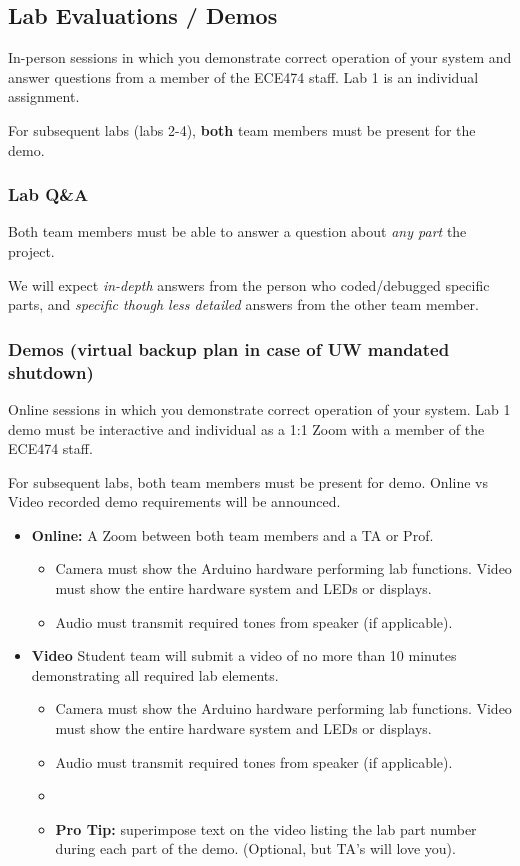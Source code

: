 \documentclass{article}	%
\begin{document}
\subsection{Lab Evaluations / Demos}


In-person sessions in which you demonstrate correct operation
of your system and answer questions from a member of the ECE474 staff.  
Lab 1 is an individual assignment.    

For subsequent labs (labs 2-4), {\bf both} team members must be present for 
the demo.    



\subsubsection{Lab Q\&A}  Both team
members must be able to answer a question about  {\it any part }
    the project.  
    
We will expect {\it in-depth} answers from the 
    person who coded/debugged specific parts, 
    and {\it specific though less detailed} answers
    from the other team member.

    
\subsubsection{Demos (virtual backup plan in case of UW mandated shutdown)}

Online sessions in which you demonstrate correct operation
of your system.  Lab 1 demo must be interactive and individual as
a 1:1 Zoom with a member of the ECE474 staff.   

For subsequent labs, both team members must be present for demo.  
Online vs Video recorded demo requirements will be announced.
\begin{itemize}
\item {\bf Online: }  A Zoom between both team members and a TA or Prof.  
    \begin{itemize}
        \item Camera must show the Arduino hardware performing lab functions. Video must show the entire hardware system and LEDs or displays.
        \item Audio must transmit required tones from speaker (if applicable). 
    \end{itemize}
\item {\bf Video} Student team will submit a video of no more than 10 minutes
demonstrating all required lab elements. 
    \begin{itemize}
        \item Camera must show the Arduino hardware performing lab functions. Video must show the entire hardware system and LEDs or displays.
        \item Audio must transmit required tones from speaker (if applicable).
        \item 
        \item {\bf Pro Tip:} superimpose text on the video listing the lab part
        number during each part of the demo.  (Optional, but TA's will love you).
    \end{itemize}
\end{itemize}
\end{document}
